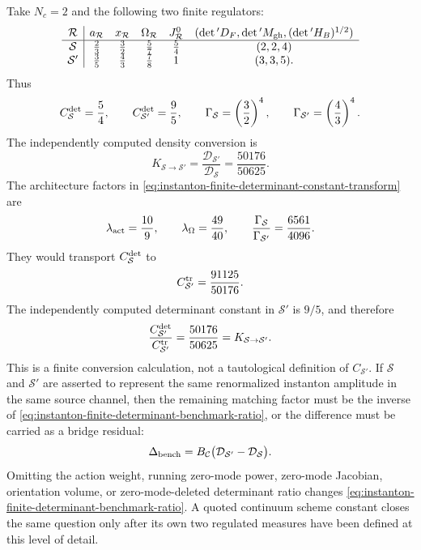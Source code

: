 \begin{controlledapproximation}
Take \(N_c=2\) and the following two finite regulators:
\[
\begin{array}{c|ccccc}
\mathcal R
& a_{\mathcal R}
& x_{\mathcal R}
& \Omega_{\mathcal R}
& J_{\mathcal R}^{0}
& (\det{}'D_F,\det{}'M_{\rm gh},(\det{}'H_B)^{1/2})
\\ \hline
\mathcal S
& \frac23
& \frac32
& \frac57
& \frac54
& (2,2,4)
\\
\mathcal S'
& \frac35
& \frac43
& \frac78
& 1
& (3,3,5).
\end{array}
\]
Thus
\[
  C_{\mathcal S}^{\rm det}=\frac54,
  \qquad
  C_{{\mathcal S}'}^{\rm det}=\frac95,
  \qquad
  \Gamma_{\mathcal S}=\left(\frac32\right)^4,
  \qquad
  \Gamma_{{\mathcal S}'}=\left(\frac43\right)^4 .
\]
The independently computed density conversion is
\begin{equation}
  K_{\mathcal S\to{\mathcal S}'}
  =
  \frac{\mathcal D_{{\mathcal S}'}}{\mathcal D_{\mathcal S}}
  =
  \frac{50176}{50625}.
  \label{eq:instanton-finite-determinant-benchmark-ratio}
\end{equation}
The architecture factors in
\eqref{eq:instanton-finite-determinant-constant-transform} are
\[
  \lambda_{\rm act}=\frac{10}{9},
  \qquad
  \lambda_\Omega=\frac{49}{40},
  \qquad
  \frac{\Gamma_{\mathcal S}}{\Gamma_{{\mathcal S}'}}
  =
  \frac{6561}{4096}.
\]
They would transport \(C_{\mathcal S}^{\rm det}\) to
\[
  C_{{\mathcal S}'}^{\rm tr}
  =
  \frac{91125}{50176}.
\]
The independently computed determinant constant in \(\mathcal S'\) is
\(9/5\), and therefore
\[
  \frac{C_{{\mathcal S}'}^{\rm det}}{C_{{\mathcal S}'}^{\rm tr}}
  =
  \frac{50176}{50625}
  =
  K_{\mathcal S\to{\mathcal S}'} .
\]
This is a finite conversion calculation, not a tautological definition of
\(C_{{\mathcal S}'}\).  If \(\mathcal S\) and \(\mathcal S'\) are asserted to
represent the same renormalized instanton amplitude in the same source channel,
then the remaining matching factor must be the inverse of
\eqref{eq:instanton-finite-determinant-benchmark-ratio}, or the difference must
be carried as a bridge residual:
\begin{equation}
  \Delta_{\rm bench}
  =
  B_{\mathcal C}
  \bigl(\mathcal D_{{\mathcal S}'}-\mathcal D_{\mathcal S}\bigr).
  \label{eq:instanton-finite-determinant-benchmark-residual}
\end{equation}
Omitting the action weight, running zero-mode power, zero-mode Jacobian,
orientation volume, or zero-mode-deleted determinant ratio changes
\eqref{eq:instanton-finite-determinant-benchmark-ratio}.  A quoted continuum
scheme constant closes the same question only after its own two regulated
measures have been defined at this level of detail.
\end{controlledapproximation}

